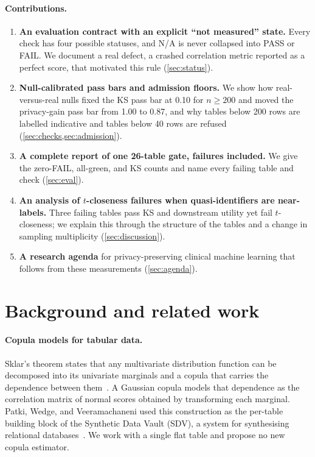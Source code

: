 \documentclass[11pt,a4paper]{article}
\begin{document}
\paragraph{Contributions.}
\begin{enumerate}
  \item \textbf{An evaluation contract with an explicit ``not measured'' state.} Every check has four possible statuses, and N/A is never collapsed into PASS or FAIL. We document a real defect, a crashed correlation metric reported as a perfect score, that motivated this rule (\cref{sec:status}).
  \item \textbf{Null-calibrated pass bars and admission floors.} We show how real-versus-real nulls fixed the KS pass bar at 0.10 for $n \ge 200$ and moved the privacy-gain pass bar from 1.00 to 0.87, and why tables below 200 rows are labelled indicative and tables below 40 rows are refused (\cref{sec:checks,sec:admission}).
  \item \textbf{A complete report of one 26-table gate, failures included.} We give the zero-FAIL, all-green, and KS counts and name every failing table and check (\cref{sec:eval}).
  \item \textbf{An analysis of $t$-closeness failures when quasi-identifiers are near-labels.} Three failing tables pass KS and downstream utility yet fail $t$-closeness; we explain this through the structure of the tables and a change in sampling multiplicity (\cref{sec:discussion}).
  \item \textbf{A research agenda} for privacy-preserving clinical machine learning that follows from these measurements (\cref{sec:agenda}).
\end{enumerate}

\section{Background and related work}\label{sec:related}

\paragraph{Copula models for tabular data.}
Sklar's theorem states that any multivariate distribution function can be decomposed into its univariate marginals and a copula that carries the dependence between them~\cite{sklar1959}. A Gaussian copula models that dependence as the correlation matrix of normal scores obtained by transforming each marginal. Patki, Wedge, and Veeramachaneni used this construction as the per-table building block of the Synthetic Data Vault (SDV), a system for synthesising relational databases~\cite{patki2016}. We work with a single flat table and propose no new copula estimator.
\end{document}
